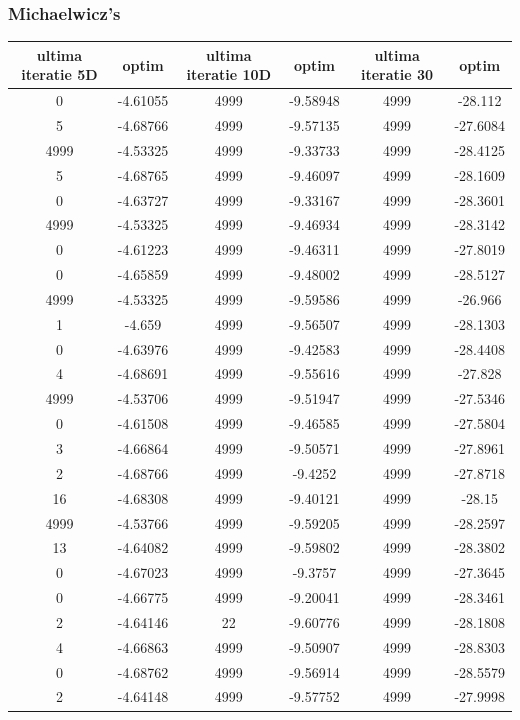 \documentclass{article}
\begin{document}
\subsubsection{Michaelwicz’s}
\begin{tabular}{cccccc}
\hline
ultima iteratie 5D& optim&ultima iteratie 10D& optim&ultima iteratie 30&optim\\
\hline
0&-4.61055&4999&-9.58948&4999&-28.112 \\ \hline
5&-4.68766&4999&-9.57135&4999&-27.6084 \\ \hline
4999&-4.53325&4999&-9.33733&4999&-28.4125 \\ \hline
5&-4.68765&4999&-9.46097&4999&-28.1609 \\ \hline
0&-4.63727&4999&-9.33167&4999&-28.3601 \\ \hline
4999&-4.53325&4999&-9.46934&4999&-28.3142 \\ \hline
0&-4.61223&4999&-9.46311&4999&-27.8019 \\ \hline
0&-4.65859&4999&-9.48002&4999&-28.5127 \\ \hline
4999&-4.53325&4999&-9.59586&4999&-26.966 \\ \hline
1&-4.659&4999&-9.56507&4999&-28.1303 \\ \hline
0&-4.63976&4999&-9.42583&4999&-28.4408 \\ \hline
4&-4.68691&4999&-9.55616&4999&-27.828 \\ \hline
4999&-4.53706&4999&-9.51947&4999&-27.5346 \\ \hline
0&-4.61508&4999&-9.46585&4999&-27.5804 \\ \hline
3&-4.66864&4999&-9.50571&4999&-27.8961 \\ \hline
2&-4.68766&4999&-9.4252&4999&-27.8718 \\ \hline
16&-4.68308&4999&-9.40121&4999&-28.15 \\ \hline
4999&-4.53766&4999&-9.59205&4999&-28.2597 \\ \hline
13&-4.64082&4999&-9.59802&4999&-28.3802 \\ \hline
0&-4.67023&4999&-9.3757&4999&-27.3645 \\ \hline
0&-4.66775&4999&-9.20041&4999&-28.3461 \\ \hline
2&-4.64146&22&-9.60776&4999&-28.1808 \\ \hline
4&-4.66863&4999&-9.50907&4999&-28.8303 \\ \hline
0&-4.68762&4999&-9.56914&4999&-28.5579 \\ \hline
2&-4.64148&4999&-9.57752&4999&-27.9998 \\ \hline

\end{tabular}
\end{document}

